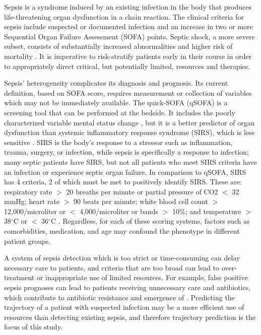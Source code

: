 
Sepsis is a syndrome induced by an existing infection in the body that produces life-threatening organ dysfunction in a chain reaction. The clinical criteria for sepsis include suspected or documented infection and an increase in two or more Sequential Organ Failure Assessment (SOFA) points. Septic shock, a more severe subset, consists of substantially increased abnormalities \cite{sepsis-3} and higher risk of mortality \cite{paoli_epidemiology_2018}. It is imperative to risk-stratify patients early in their course in order to appropriately direct critical, but potentially limited, resources and therapies.

Sepsis' heterogeneity complicates its diagnosis and prognosis. Its current definition, based on SOFA score, requires measurement or collection of variables which may not be immediately available. The quick-SOFA (qSOFA) is a screening tool that can be performed at the bedside. It includes the poorly characterized variable mental status change \cite{sepsis-3}, but it is a better predictor of organ dysfunction than systemic inflammatory response syndrome (SIRS), which is less sensitive \cite{sirs_1992, seymour_assessment_2016}. SIRS is the body's response to a stressor such as inflammation, trauma, surgery, or infection, while sepsis is specifically a response to infection; many septic patients have SIRS, but not all patients who meet SIRS criteria have an infection or experience septic organ failure. In comparison to qSOFA, SIRS has 4 criteria, 2 of which must be met to positively identify SIRS. These are: respiratory rate $>$ 20 breaths per minute or partial pressure of CO2 $<$ 32 mmHg; heart rate $>$ 90 beats per minute; white blood cell count $>$ 12,000/microliter or $<$ 4,000/microliter or bands $>$ 10\%; and temperature $>$38$^{\circ}$C or $<$ 36$^{\circ}$C \cite{sirs_chakraborty_systemic_2022}. Regardless, for each of these scoring systems, factors such as comorbidities, medication, and age may confound the phenotype in different patient groups. 

A system of sepsis detection which is too strict or time-consuming can delay necessary care to patients, and criteria that are too broad can lead to over-treatment or inappropriate use of limited resources. For example, false positive sepsis prognoses can lead to patients receiving unnecessary care and antibiotics, which contribute to antibiotic resistance and emergence of  \cite{vanepps_reducing_2018, prestinaci_antimicrobial_2015, chokshi_global_2019}. Predicting the trajectory of a patient with suspected infection may be a more efficient use of resources than detecting existing sepsis, and therefore trajectory prediction is the focus of this study. 

